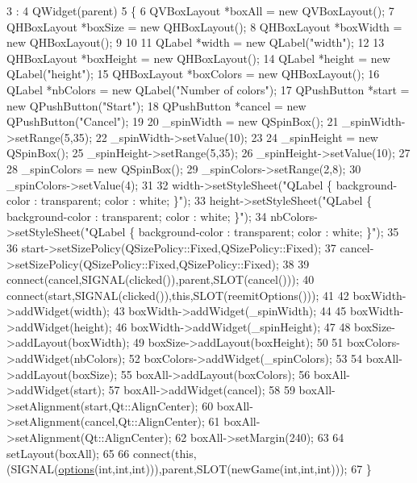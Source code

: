 \begin{DoxyCode}
3                                 :
4     QWidget(parent)
5 \{
6     QVBoxLayout *boxAll = \textcolor{keyword}{new} QVBoxLayout();
7     QHBoxLayout *boxSize = \textcolor{keyword}{new} QHBoxLayout();
8     QHBoxLayout *boxWidth = \textcolor{keyword}{new} QHBoxLayout();
9 
10 
11     QLabel *width = \textcolor{keyword}{new} QLabel(\textcolor{stringliteral}{"width"});
12 
13     QHBoxLayout *boxHeight = \textcolor{keyword}{new} QHBoxLayout();
14     QLabel *height = \textcolor{keyword}{new} QLabel(\textcolor{stringliteral}{"height"});
15     QHBoxLayout *boxColors = \textcolor{keyword}{new} QHBoxLayout();
16     QLabel *nbColors = \textcolor{keyword}{new} QLabel(\textcolor{stringliteral}{"Number of colors"});
17     QPushButton *start = \textcolor{keyword}{new} QPushButton(\textcolor{stringliteral}{"Start"});
18     QPushButton *cancel = \textcolor{keyword}{new} QPushButton(\textcolor{stringliteral}{"Cancel"});
19 
20     \_spinWidth = \textcolor{keyword}{new} QSpinBox();
21     \_spinWidth->setRange(5,35);
22     \_spinWidth->setValue(10);
23 
24     \_spinHeight = \textcolor{keyword}{new} QSpinBox();
25     \_spinHeight->setRange(5,35);
26     \_spinHeight->setValue(10);
27 
28     \_spinColors = \textcolor{keyword}{new} QSpinBox();
29     \_spinColors->setRange(2,8);
30     \_spinColors->setValue(4);
31 
32     width->setStyleSheet(\textcolor{stringliteral}{"QLabel \{ background-color : transparent; color : white; \}"});
33     height->setStyleSheet(\textcolor{stringliteral}{"QLabel \{ background-color : transparent; color : white; \}"});
34     nbColors->setStyleSheet(\textcolor{stringliteral}{"QLabel \{ background-color : transparent; color : white; \}"});
35 
36     start->setSizePolicy(QSizePolicy::Fixed,QSizePolicy::Fixed);
37     cancel->setSizePolicy(QSizePolicy::Fixed,QSizePolicy::Fixed);
38 
39     connect(cancel,SIGNAL(clicked()),parent,SLOT(cancel()));
40     connect(start,SIGNAL(clicked()),\textcolor{keyword}{this},SLOT(reemitOptions()));
41 
42     boxWidth->addWidget(width);
43     boxWidth->addWidget(\_spinWidth);
44 
45     boxWidth->addWidget(height);
46     boxWidth->addWidget(\_spinHeight);
47 
48     boxSize->addLayout(boxWidth);
49     boxSize->addLayout(boxHeight);
50 
51     boxColors->addWidget(nbColors);
52     boxColors->addWidget(\_spinColors);
53 
54     boxAll->addLayout(boxSize);
55     boxAll->addLayout(boxColors);
56     boxAll->addWidget(start);
57     boxAll->addWidget(cancel);
58 
59     boxAll->setAlignment(start,Qt::AlignCenter);
60     boxAll->setAlignment(cancel,Qt::AlignCenter);
61     boxAll->setAlignment(Qt::AlignCenter);
62     boxAll->setMargin(240);
63 
64     setLayout(boxAll);
65 
66     connect(\textcolor{keyword}{this},(SIGNAL(\hyperlink{class_options_aebc534fbc72d1be99b44fdd691d10ebc}{options}(\textcolor{keywordtype}{int},\textcolor{keywordtype}{int},\textcolor{keywordtype}{int}))),parent,SLOT(newGame(\textcolor{keywordtype}{int},\textcolor{keywordtype}{int},\textcolor{keywordtype}{int})));
67 \}
\end{DoxyCode}
\hypertarget{class_options_a86ddb85b183f8b58af5481f30a42fa92}{}\label{class_options_a86ddb85b183f8b58af5481f30a42fa92} 
